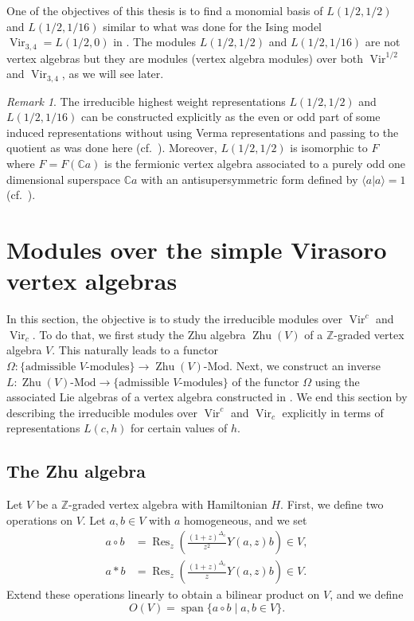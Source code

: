 \documentclass[a4paper, 12pt, reqno]{amsart}
\theoremstyle{remark}
\newtheorem{remark}[theorem]{Remark}
\numberwithin{equation}{subsection}
\DeclareMathOperator{\Vir}{Vir}
\DeclareMathOperator{\vspan}{span}
\DeclareMathOperator{\Res}{Res}
\DeclareMathOperator{\one}{\overline{1}}
\DeclareMathOperator{\Zhu}{Zhu}
\begin{document}
One of the objectives of this thesis is to find a monomial basis of $L(1/2, 1/2)$ and $L(1/2, 1/16)$ similar to what was done for the Ising model $\Vir_{3, 4} = L(1/2, 0)$ in \cite{andrews_singular_2022}.
The modules $L(1/2, 1/2)$ and $L(1/2, 1/16)$ are not vertex algebras but they are modules (vertex algebra modules) over both $\Vir^{1/2}$ and $\Vir_{3, 4}$, as we will see later.

\begin{remark}
  \label{rmk:30}
  The irreducible highest weight representations $L(1/2, 1/2)$ and $L(1/2, 1/16)$ can be constructed explicitly as the even or odd part of some induced representations without using Verma representations and passing to the quotient as was done here (cf.\ \cite[\S3]{kac_bombay_2013}).
  Moreover, $L(1/2, 1/2)$ is isomorphic to $F_{\one}$ where $F = F(\mathbb{C}a)$ is the fermionic vertex algebra associated to a purely odd one dimensional superspace $\mathbb{C}a$ with an antisupersymmetric form defined by $\langle a| a\rangle = 1$ (cf.\ ).
\end{remark}

\section{Modules over the simple Virasoro vertex algebras}
\label{sec:modules-over-simple}

In this section, the objective is to study the irreducible modules over $\Vir^c$ and $\Vir_c$.
To do that, we first study the Zhu algebra $\Zhu(V)$ of a $\mathbb{Z}$-graded vertex algebra $V$.
This naturally leads to a functor $\Omega: \{\text{admissible $V$-modules}\} \to \Zhu(V)\text{-Mod}$.
Next, we construct an inverse $L: \Zhu(V)\text{-Mod} \to \{\text{admissible $V$-modules}\}$ of the functor $\Omega$ using the associated Lie algebras of a vertex algebra constructed in .
We end this section by describing the irreducible modules over $\Vir^c$ and $\Vir_c$ explicitly in terms of representations $L(c, h)$ for certain values of $h$.

\subsection{The Zhu algebra}
\label{sec:zhu-algebra}

Let $V$ be a $\mathbb{Z}$-graded vertex algebra with Hamiltonian $H$.
First, we define two operations on $V$.
Let $a, b \in V$ with $a$ homogeneous, and we set
\begin{align*}
  a\circ b &= \Res_z\left(\frac{(1 + z)^{\Delta_a}}{z^2}Y(a, z)b\right) \in V, \\
  a*b &= \Res_z\left(\frac{(1 + z)^{\Delta_a}}{z}Y(a, z)b\right) \in V.
\end{align*}
Extend these operations linearly to obtain a bilinear product on $V$, and we define
\begin{equation*}
  O(V) = \vspan\{a\circ b \mid a, b \in V\}.
\end{equation*}
\end{document}
